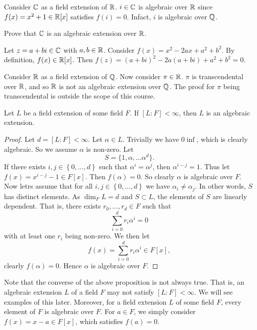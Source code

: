 \begin{example}[]
	Consider $\mathbb{C}$ as a field extension of $\mathbb{R}$.
	$i \in \mathbb{C}$ is algebraic over $\mathbb{R}$ since $f(x) = x^2 + 1 \in \mathbb{R}[x]$
	satisfies $f(i) = 0$.
	Infact, $i$ is algebraic over $\mathbb{Q}$.
\end{example}

\begin{problem}
	Prove that $\mathbb{C}$ is an algebraic extension over $\mathbb{R}$.
\end{problem}

\begin{solution}
	Let $z = a + bi \in \mathbb{C}$ with $a,b \in \mathbb{R}$.
	Consider $f(x) = x^2 -2ax + a^2 + b^2$.
	By definition, $f(x) \in \mathbb{R}[x]$.
	Then $
		f(z)
		= (a + bi)^2 - 2a(a + bi) + a^2 + b^2
		= 0
	$.
\end{solution}

\begin{example}[]
	Consider $\mathbb{R}$ as a field extension of $\mathbb{Q}$.
	Now consider $\pi \in \mathbb{R}$.
	$\pi$ is transcendental over $\mathbb{R}$, and so $\mathbb{R}$ is not an
	algebraic extension over $\mathbb{Q}$.
	The proof for $\pi$ being transcendental is outside the scope of this 
	course.
\end{example}

\begin{proposition}[]
	Let $L$ be a field extension of some field $F$.
	If $[L:F] < \infty$, then $L$ is an algebraic extension.
\end{proposition}

\begin{proof}
	Let $d = [L:F] < \infty$.
	Let $\alpha \in L$.
	Trivially we have $0 \inf$, which is clearly algebraic. So we assume $\alpha$
	is non-zero.
	Let \[
		S = \{1, \alpha, \ldots \alpha^d\}.
	\]	
	If there exists $i, j \in \left\{ 0, \ldots, d \right\}$ 
	such that $\alpha^i = \alpha^j$, then
	$\alpha^{i - j} = 1$.
	Thus let $f(x) = x^{i - j} - 1 \in F[x]$.
	Then $f(\alpha) = 0$.
	So clearly $\alpha$ is algebraic over $F$.
	Now letrs assume that for all $i, j \in \left\{ 0, \ldots, d \right\}$
	we have $\alpha_i \neq \alpha_j$.
	In other words, $S$ has distinct elements.
	As $\dim_F L = d$ and $S \subset L$, the elements of $S$ are linearly 
	dependent.
	That is, there exists $r_0, \ldots, r_d \in F$ such that \[
		\sum_{i = 0}^d r_i \alpha^i = 0
	\]
	with at least one $r_i$ being non-zero.
	We then let \[
		f(x) =
		\sum_{i = 0}^d r_i \alpha^i \in F[x],
	\]
	clearly $f(\alpha) = 0$.
	Hence $\alpha$ is algebraic over $F$.
\end{proof}

Note that the converse of the above proposition is not always true.
That is, an algebraic extension $L$ of a field $F$ may not satisfy
$[L:F] < \infty$.
We will see examples of this later.
Moreover, for a field extension $L$ of some field $F$,
every element of $F$ is algebraic over $F$.
For $a \in F$, we simply consider $f(x) = x - a \in F[x]$,
which satisfies $f(a) = 0$.
